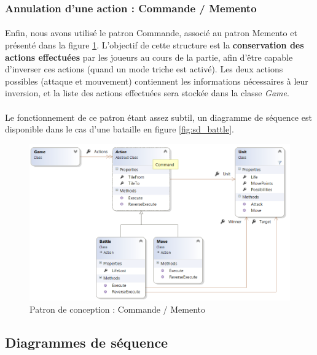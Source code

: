 \subsubsection{Annulation d'une action : Commande / Memento}

\label{command}

\paragraph{}
Enfin, nous avons utilisé le patron Commande, associé au patron Memento et présenté dans la figure \ref{fig:command}.
L'objectif de cette structure est la \textbf{conservation des actions effectuées} par les joueurs au cours de la partie, afin d'être capable d'inverser ces actions (quand un mode triche est activé).
Les deux actions possibles (attaque et mouvement) contiennent les informations nécessaires à leur inversion, et la liste des actions effectuées sera stockée dans la classe \emph{Game}.

\paragraph{}
Le fonctionnement de ce patron étant assez subtil, un diagramme de séquence est disponible dans le cas d'une bataille en figure \ref{fig:sd_battle}.

\begin{figure}
  \centering
  \includegraphics[width=13cm]{schemas/dp_command.png}
  \caption{Patron de conception : Commande / Memento}
  \label{fig:command}
\end{figure}

\subsection{Diagrammes de séquence}
\label{diagSequence}
